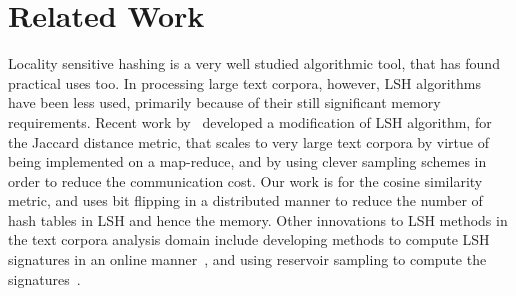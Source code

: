 
\section{Related Work}
Locality sensitive hashing is a very well studied algorithmic tool, that has found practical uses too. 
In processing large text corpora, however, LSH algorithms have been less used, primarily because of their
still significant memory requirements. Recent work by~\cite{zadeh2013dimension} developed a modification of LSH algorithm, for 
the Jaccard distance metric, that scales to very large text corpora by virtue of being implemented on a map-reduce, 
and by using clever sampling schemes in order to reduce the communication cost. Our work is for the cosine similarity metric, 
and uses bit flipping in a distributed manner to reduce the number of hash tables in LSH and hence the memory. 
Other innovations to LSH methods in the text corpora analysis domain include developing methods to compute
LSH signatures in an online manner~\cite{van2010online}, and using reservoir sampling to compute the signatures~\cite{van2011efficient}.
